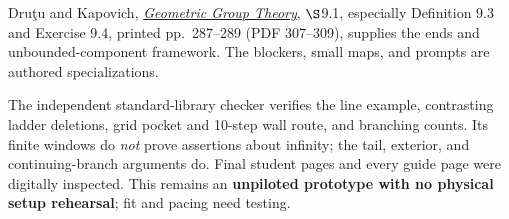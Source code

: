 \documentclass[11pt,letterpaper]{article}
\newcommand{\heading}[1]{\par\vspace{5pt}{\large\bfseries #1}\par}
\begin{document}
\heading{Sources and checking limits}
Dru\c{t}u and Kapovich, \href{https://www.math.ucdavis.edu/~kapovich/EPR/ggt.pdf}{\emph{Geometric Group Theory}}, $\S$9.1, especially Definition 9.3 and Exercise 9.4, printed pp.\ 287--289 (PDF 307--309), supplies the ends and unbounded-component framework. The blockers, small maps, and prompts are authored specializations.

The independent standard-library checker verifies the line example, contrasting ladder deletions, grid pocket and 10-step wall route, and branching counts. Its finite windows do \emph{not} prove assertions about infinity; the tail, exterior, and continuing-branch arguments do. Final student pages and every guide page were digitally inspected. This remains an \textbf{unpiloted prototype with no physical setup rehearsal}; fit and pacing need testing.
\end{document}
